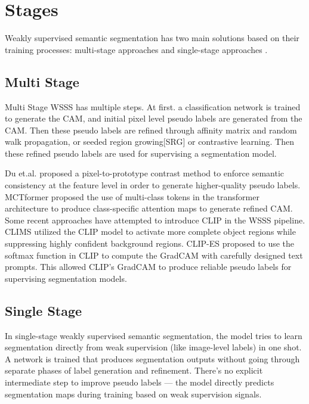 \section{Stages}
\label{sec:stages}

Weakly supervised semantic segmentation has two main solutions based on their training processes: multi-stage approaches \cite{instance_wsss, l2g, lee} and single-stage approaches \cite{wsss_reliability_does_matter, wsss_afa_affinity_from_attention}. 

\subsection{Multi Stage}
\label{subsec:multi-stage}

Multi Stage WSSS has multiple steps. At first. a classification network is trained to generate the CAM, and initial pixel level pseudo labels are generated from the CAM. Then these pseudo labels are refined through affinity matrix and random walk propagation\cite{wsss_affinitynet, wsss_afa_affinity_from_attention}, or seeded region growing[SRG] or contrastive learning. Then these refined pseudo labels are used for supervising a segmentation model.

Du et.al. \cite{pixel_to_prototype} proposed a pixel-to-prototype contrast method to enforce semantic consistency at  the feature level in order to generate higher-quality pseudo labels. MCTformer \cite{MCTformer} proposed the use of multi-class tokens in the transformer architecture to produce class-specific attention maps to generate refined CAM. Some recent approaches have attempted to introduce CLIP in the WSSS pipeline. CLIMS \cite{clims} utilized the CLIP model to activate more complete object regions while suppressing highly confident background regions. CLIP-ES \cite{wsss_clip_es} proposed to use the softmax function in CLIP to compute the GradCAM \cite{cam_grad} with carefully designed text prompts. This allowed CLIP's GradCAM to produce reliable pseudo labels for supervising segmentation models.

\subsection{Single Stage}
\label{subsec:single-stage}

In single-stage weakly supervised semantic segmentation, the model tries to learn segmentation directly from weak supervision (like image-level labels) in one shot. A network is trained that produces segmentation outputs without going through separate phases of label generation and refinement. There’s no explicit intermediate step to improve pseudo labels — the model directly predicts segmentation maps during training based on weak supervision signals.

